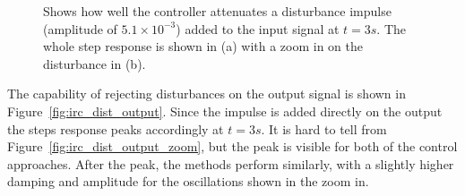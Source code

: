 \begin{figure}[h!]
  \centering %
  \qquad
  \caption{\label{fig:irc_dist_input} Shows how well the controller attenuates a disturbance impulse (amplitude of $5.1 \times 10^{-3}$) added to the input signal at $t=3s$. The whole step response is shown in (a) with a zoom in on the disturbance in (b).}
\end{figure}

The \abbrIRC capability of rejecting disturbances on the output signal is shown in Figure~\ref{fig:irc_dist_output}. Since the impulse is added directly on the output the steps response peaks accordingly at $t=3s$. It is hard to tell from Figure~\ref{fig:irc_dist_output_zoom}, but the peak is visible for both of the control approaches. After the peak, the methods perform similarly, with a slightly higher damping and amplitude for the \abbrIRC oscillations shown in the zoom in.

